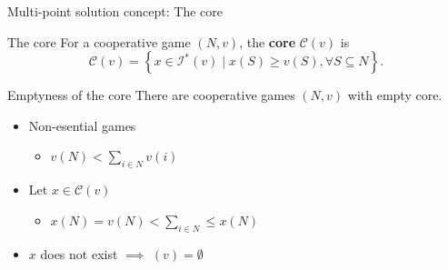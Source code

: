 \documentclass{beamer}
\newcommand{\I}{\mathcal{I}}
\begin{document}


\begin{frame}{Multi-point solution concept: The core}
    \begin{block}{The core}
    For a cooperative game $(N,v)$, the \textbf{core} $\mathcal{C}(v)$ is
    \[\mathcal{C}(v) = \left\{x \in \I^*(v) \mid x(S) \geq v(S), \forall S \subseteq N \right\}.\]
    \end{block}
    \begin{block}{Emptyness of the core}
        There are cooperative games $\left(N,v\right)$ with empty core.
    \end{block}
    \begin{itemize}
        \item Non-esential games
        \begin{itemize}
            \item $v\left(N\right) < \sum_{i \in N}v\left(i\right)$
        \end{itemize}
        \item Let $x \in \mathcal{C}\left(v\right)$
        \begin{itemize}
            \item $x\left(N\right)=v\left(N\right)<\sum_{i\in N}\leq x\left(N\right)$ 
        \end{itemize}
        \item $x$ does not exist $\implies$ $\left(v\right)=\emptyset$
    \end{itemize}
\end{frame}


\end{document}
